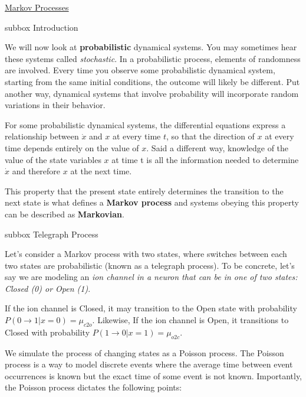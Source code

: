 \begin{textbox}{\href{https://colab.research.google.com/github/NeuromatchAcademy/course-content/blob/master/tutorials/W2D2_LinearSystems/student/W2D2_Tutorial2.ipynb}{Markov Processes }   }
\begin{subbox}{subbox}{  Introduction }

\scriptsize

We will now look at \textbf{probabilistic} dynamical systems. You may sometimes hear these systems called \textit{stochastic}. In a probabilistic process, elements of randomness are involved. Every time you observe some probabilistic dynamical system, starting from the same initial conditions, the outcome will likely be different. Put another way, dynamical systems that involve probability will incorporate random variations in their behavior. 

For some probabilistic dynamical systems, the differential equations express a relationship between $\dot{x}$ and $x$ at every time $t$, so that the direction of $x$ at every time depends entirely on the value of $x$. Said a different way, knowledge of the value of the state variables $x$ at time t is all the information needed to determine $\dot{x}$ and therefore $x$ at the next time.

This property that the present state entirely determines the transition to the next state  is what defines a \textbf{Markov process} and systems obeying this property can be described as \textbf{Markovian}.


\end{subbox}
\begin{subbox}{subbox}{ Telegraph Process}

\scriptsize

Let's consider a Markov process with two states, where switches between each two states are probabilistic (known as a telegraph process). To be concrete, let's say we are modeling an \textit{ion channel in a neuron that can be in one of two states: Closed (0) or Open (1)}. 

If the ion channel is Closed, it may transition to the Open state with probability $P(0 \rightarrow 1 | x = 0) = \mu_{c2o}$. Likewise, If the ion channel is Open, it transitions to Closed with probability $P(1 \rightarrow 0 | x=1) = \mu_{o2c}$.

We simulate the process of changing states as a Poisson process. The Poisson process is a way to model discrete events where the average time between event occurrences is known but the exact time of some event is not known. Importantly, the Poisson process dictates the following points: 


\end{subbox}
\end{textbox}
